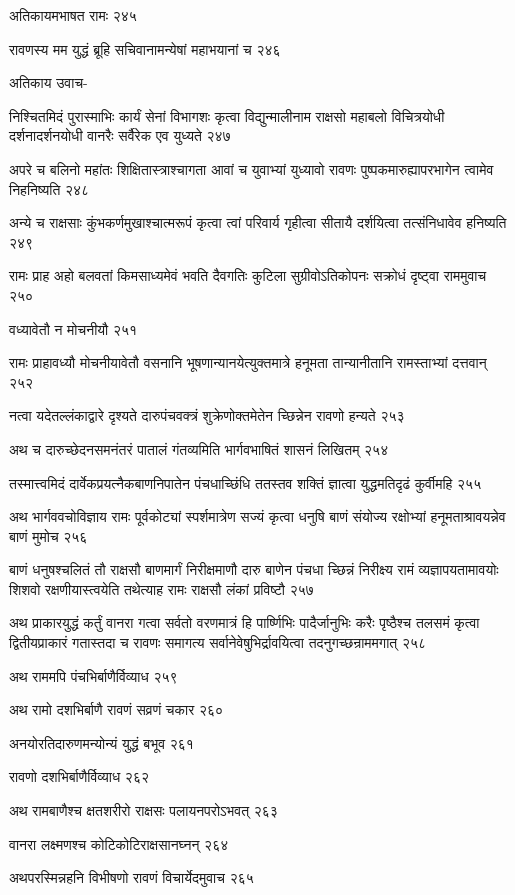 अतिकायमभाषत रामः २४५

रावणस्य मम युद्धं ब्रूहि सचिवानामन्येषां महाभयानां च २४६

अतिकाय उवाच-

निश्चितमिदं पुरास्माभिः कार्यं सेनां विभागशः कृत्वा विद्युन्मालीनाम राक्षसो महाबलो
विचित्रयोधी दर्शनादर्शनयोधी वानरैः सर्वैरेक एव युध्यते २४७

अपरे च बलिनो महांतः शिक्षितास्त्राश्चागता आवां च युवाभ्यां युध्यावो रावणः
पुष्पकमारुह्यापरभागेन त्वामेव निहनिष्यति २४८

अन्ये च राक्षसाः कुंभकर्णमुखाश्चात्मरूपं कृत्वा त्वां परिवार्य गृहीत्वा सीतायै दर्शयित्वा
तत्संनिधावेव हनिष्यति २४९

रामः प्राह अहो बलवतां किमसाध्यमेवं भवति दैवगतिः कुटिला सुग्रीवोऽतिकोपनः सक्रोधं
दृष्ट्वा राममुवाच २५०

वध्यावेतौ न मोचनीयौ २५१

रामः प्राहावध्यौ मोचनीयावेतौ वसनानि भूषणान्यानयेत्युक्तमात्रे हनूमता तान्यानीतानि
रामस्ताभ्यां दत्तवान् २५२

नत्वा यदेतल्लंकाद्वारे दृश्यते दारुपंचवक्त्रं शुक्रेणोक्तमेतेन च्छिन्नेन रावणो हन्यते २५३

अथ च दारुच्छेदनसमनंतरं पातालं गंतव्यमिति भार्गवभाषितं शासनं लिखितम् २५४

तस्मात्त्वमिदं दार्वेकप्रयत्नैकबाणनिपातेन पंचधाच्छिंधि ततस्तव शक्तिं ज्ञात्वा युद्धमतिदृढं
कुर्वीमहि २५५

अथ भार्गववचोविज्ञाय रामः पूर्वकोट्यां स्पर्शमात्रेण सज्यं कृत्वा धनुषि बाणं संयोज्य
रक्षोभ्यां हनूमताश्रावयन्नेव बाणं मुमोच २५६

बाणं धनुषश्चलितं तौ राक्षसौ बाणमार्गं निरीक्षमाणौ दारु बाणेन पंचधा च्छिन्नं निरीक्ष्य
रामं व्यज्ञापयतामावयोः शिशवो रक्षणीयास्त्वयेति तथेत्याह रामः राक्षसौ लंकां प्रविष्टौ
२५७

अथ प्राकारयुद्धं कर्तुं वानरा गत्वा सर्वतो वरणमात्रं हि पार्ष्णिभिः पादैर्जानुभिः करैः
पृष्ठैश्च तलसमं कृत्वा द्वितीयप्राकारं गतास्तदा च रावणः समागत्य सर्वानेवेषुभिर्द्रावयित्वा
तदनुगच्छन्राममगात् २५८

अथ राममपि पंचभिर्बाणैर्विव्याध २५९

अथ रामो दशभिर्बाणै रावणं सव्रणं चकार २६०

अनयोरतिदारुणमन्योन्यं युद्धं बभूव २६१

रावणो दशभिर्बाणैर्विव्याध २६२

अथ रामबाणैश्च क्षतशरीरो राक्षसः पलायनपरोऽभवत् २६३

वानरा लक्ष्मणश्च कोटिकोटिराक्षसानघ्नन् २६४

अथपरस्मिन्नहनि विभीषणो रावणं विचार्येदमुवाच २६५


